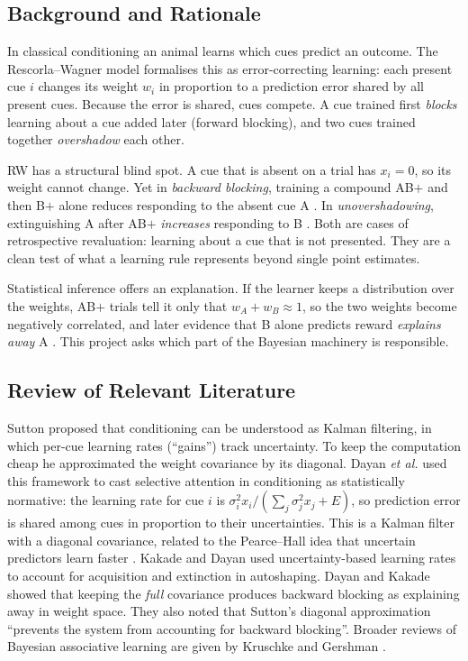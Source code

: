 \documentclass[conference,a4paper]{IEEEtran}
\begin{document}
\subsection{Background and Rationale}
In classical conditioning an animal learns which cues predict an outcome. The
Rescorla--Wagner model \cite{rescorla1972} formalises this as error-correcting
learning: each present cue $i$ changes its weight $w_i$ in proportion to a
prediction error shared by all present cues. Because the error is shared, cues
compete. A cue trained first \emph{blocks} learning about a cue added later
(forward blocking), and two cues trained together \emph{overshadow} each other.

RW has a structural blind spot. A cue that is absent on a trial has $x_i = 0$,
so its weight cannot change. Yet in \emph{backward blocking}, training a compound
AB$+$ and then B$+$ alone reduces responding to the absent cue A
\cite{shanks1985}. In \emph{unovershadowing}, extinguishing A after AB$+$
\emph{increases} responding to B \cite{matzel1985}. Both are cases of
retrospective revaluation: learning about a cue that is not presented. They are a
clean test of what a learning rule represents beyond single point estimates.

Statistical inference offers an explanation. If the learner keeps a distribution
over the weights, AB$+$ trials tell it only that $w_A + w_B \approx 1$, so the two
weights become negatively correlated, and later evidence that B alone predicts
reward \emph{explains away} A \cite{dayan2001}. This project asks which part of
the Bayesian machinery is responsible.

\subsection{Review of Relevant Literature}
Sutton \cite{sutton1992} proposed that conditioning can be understood as Kalman
filtering, in which per-cue learning rates (``gains'') track uncertainty. To keep
the computation cheap he approximated the weight covariance by its diagonal.
Dayan \emph{et al.} \cite{dkm2000} used this framework to cast selective attention
in conditioning as statistically normative: the learning rate for cue $i$ is
$\sigma_i^2 x_i / (\sum_j \sigma_j^2 x_j + E)$, so prediction error is shared
among cues in proportion to their uncertainties. This is a Kalman filter with a
diagonal covariance, related to the Pearce--Hall idea that uncertain predictors
learn faster \cite{pearce1980}. Kakade and Dayan \cite{kakade2002} used
uncertainty-based learning rates to account for acquisition and extinction in
autoshaping. Dayan and Kakade \cite{dayan2001} showed that keeping the
\emph{full} covariance produces backward blocking as explaining away in weight
space. They also noted that Sutton's diagonal approximation ``prevents the system
from accounting for backward blocking''. Broader reviews of Bayesian associative
learning are given by Kruschke \cite{kruschke2008} and Gershman \cite{gershman2015}.
\end{document}
